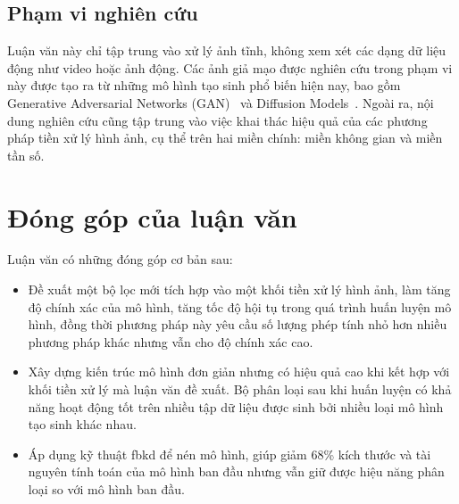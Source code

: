 \subsection{Phạm vi nghiên cứu}

%

Luận văn này chỉ tập trung vào xử lý ảnh tĩnh, không xem xét các dạng dữ liệu động như video hoặc ảnh động. Các ảnh giả mạo được nghiên cứu trong phạm vi này được tạo ra từ những mô hình tạo sinh phổ biến hiện nay, bao gồm Generative Adversarial Networks (GAN)~\cite{Goodfellow2014GenerativeAN} và Diffusion Models~\cite{Ho2020DenoisingDP}. Ngoài ra, nội dung nghiên cứu cũng tập trung vào việc khai thác hiệu quả của các phương pháp tiền xử lý hình ảnh, cụ thể trên hai miền chính: miền không gian và miền tần số.


\section{Đóng góp của luận văn}
Luận văn có những đóng góp cơ bản sau:
\begin{itemize}
	\item Đề xuất một bộ lọc mới tích hợp vào một khối tiền xử lý hình ảnh, làm tăng độ chính xác của mô hình, tăng tốc độ hội tụ trong quá trình huấn luyện mô hình, đồng thời phương pháp này yêu cầu số lượng phép tính nhỏ hơn nhiều phương pháp khác nhưng vẫn cho độ chính xác cao.
	\item Xây dựng kiến trúc mô hình đơn giản nhưng có hiệu quả cao khi kết hợp với khối tiền xử lý mà luận văn đề xuất. Bộ phân loại sau khi huấn luyện có khả năng hoạt động tốt trên nhiều tập dữ liệu được sinh bởi nhiều loại mô hình tạo sinh khác nhau.
	\item Áp dụng kỹ thuật \gls{fbkd} để nén mô hình, giúp giảm 68\% kích thước và tài nguyên tính toán của mô hình ban đầu nhưng vẫn giữ được hiệu năng phân loại so với mô hình ban đầu.

\end{itemize}

